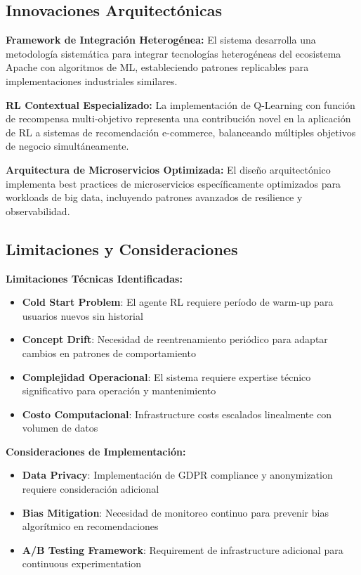 \subsection{Innovaciones Arquitectónicas}
\label{subsec:innovaciones}

\textbf{Framework de Integración Heterogénea:}
El sistema desarrolla una metodología sistemática para integrar tecnologías heterogéneas del ecosistema Apache con algoritmos de ML, estableciendo patrones replicables para implementaciones industriales similares.

\textbf{RL Contextual Especializado:}
La implementación de Q-Learning con función de recompensa multi-objetivo representa una contribución novel en la aplicación de RL a sistemas de recomendación e-commerce, balanceando múltiples objetivos de negocio simultáneamente.

\textbf{Arquitectura de Microservicios Optimizada:}
El diseño arquitectónico implementa best practices de microservicios específicamente optimizados para workloads de big data, incluyendo patrones avanzados de resilience y observabilidad.

\subsection{Limitaciones y Consideraciones}
\label{subsec:limitaciones}

\textbf{Limitaciones Técnicas Identificadas:}
\begin{itemize}[leftmargin=*, itemsep=0.1cm]
\item \textbf{Cold Start Problem}: El agente RL requiere período de warm-up para usuarios nuevos sin historial
\item \textbf{Concept Drift}: Necesidad de reentrenamiento periódico para adaptar cambios en patrones de comportamiento
\item \textbf{Complejidad Operacional}: El sistema requiere expertise técnico significativo para operación y mantenimiento
\item \textbf{Costo Computacional}: Infrastructure costs escalados linealmente con volumen de datos
\end{itemize}

\textbf{Consideraciones de Implementación:}
\begin{itemize}[leftmargin=*, itemsep=0.1cm]
\item \textbf{Data Privacy}: Implementación de GDPR compliance y anonymization requiere consideración adicional
\item \textbf{Bias Mitigation}: Necesidad de monitoreo continuo para prevenir bias algorítmico en recomendaciones
\item \textbf{A/B Testing Framework}: Requirement de infrastructure adicional para continuous experimentation
\end{itemize}

